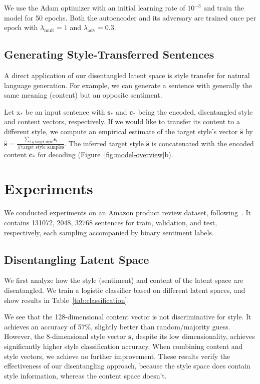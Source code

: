\documentclass[11pt,a4paper]{article}
\newcommand{\rmx}{\mathrm x}
\begin{document}
We use the Adam optimizer \cite{kingma2014adam} with an initial learning rate of $10^{-3}$ and train the model for 50 epochs. Both the autoencoder and its adversary are trained once per epoch with $\lambda_\text{mult} = 1$ and $\lambda_\text{adv} = 0.3$.

\subsection{Generating Style-Transferred Sentences} \label{ss:prediction}

A direct application of our disentangled latent space is style transfer for natural language generation. For example, we can generate a sentence with generally the same meaning (content) but an opposite sentiment.

Let $\rmx_*$ be an input sentence with $\bm s_*$ and $\bm c_*$ being the encoded, disentangled style and content vectors, respectively. If we would like to transfer its content to a different style, we compute an empirical estimate of the target style's vector $\hat{\bm s}$ by
$\hat{\bm s}=\frac{\sum_{i\in\text{target style}}\bm s_i}{\text{\# target style samples}}$. The inferred target style $\hat{\bm s}$ is concatenated with the encoded content $\bm c_*$ for decoding (Figure~\ref{fig:model-overview}b).

\section{Experiments}
We conducted experiments on an Amazon product review dataset, following~. It contains 131072, 2048, 32768 sentences for train, validation, and test, respectively, each sampling accompanied by binary sentiment labels.

\subsection{Disentangling Latent Space}


We first analyze how the style (sentiment) and content of the latent space are disentangled. We train a logistic classifier based on different latent spaces, and show results in Table~\ref{tab:classification}.

We see that the 128-dimensional content vector is not discriminative for style. It achieves an accuracy of 57\%, slightly better than random/majority guess. However, the 8-dimensional style vector $\bm s$, despite its low dimensionality, achieves significantly higher style classification accuracy. When combining content and style vectors, we achieve no further improvement. These results verify the effectiveness of our disentangling approach, because the style space does contain style information, whereas the content space doesn't.
\end{document}
